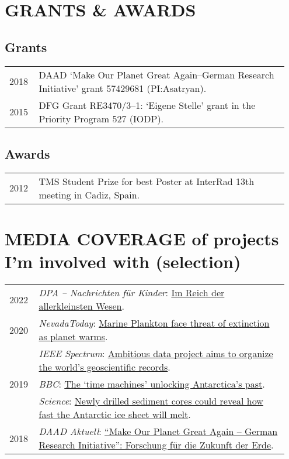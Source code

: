 \documentclass[11pt, a4paper]{article}
\begin{document}
\section{GRANTS \& AWARDS}
\subsection{Grants}
\begin{longtable}{@{}p{0.1\linewidth} P{0.85\linewidth}@{}}
2018 & DAAD `Make Our Planet Great Again--German Research Initiative' grant 57429681 (PI:Asatryan).\\
2015 & DFG Grant RE3470/3--1: `Eigene Stelle' grant in the Priority Program 527 (IODP).\\
\end{longtable}
\subsection{Awards}
\begin{longtable}{@{}p{0.1\linewidth} P{0.85\linewidth}@{}}
2012 & TMS Student Prize for best Poster at InterRad 13th meeting in Cadiz, Spain.\\
\end{longtable}

\section[MEDIA COVERAGE]{MEDIA COVERAGE \textnormal{\footnotesize{ of projects I'm involved with (selection)}}}
\begin{longtable}{@{}p{0.1\linewidth} P{0.85\linewidth}@{}}
2022 & \emph{DPA -- Nachrichten für Kinder}: \href{https://www.aachener-zeitung.de/karlo-clever/im-reich-der-allerkleinsten-wesen_aid-73918737}{Im Reich der allerkleinsten Wesen}.\\
2020 & \emph{NevadaToday}: \href{https://www.unr.edu/nevada-today/news/2020/marine-plankton}{Marine Plankton face threat of extinction as planet warms}.\\
 & \emph{IEEE Spectrum}: \href{https://spectrum.ieee.org/computing/software/ambitious-data-project-aims-to-organize-the-worlds-geoscientific-records}{Ambitious data project aims to organize the world’s geoscientific records}.\\
2019 & \emph{BBC}: \href{https://www.bbc.com/reel/video/p07bvx51/the-time-machines-unlocking-antarctica-s-past}{The `time machines' unlocking Antarctica's past}.\\
  & \emph{Science}: \href{http://dx.doi.org/10.1126/science.aax7040}{Newly drilled sediment cores could reveal how fast the Antarctic ice sheet will melt}.\\
2018 & \emph{DAAD Aktuell}: \href{https://www.daad.de/der-daad/daad-aktuell/de/66800-make-our-planet-great-again-german-research-initiative-forschung-fuer-die-zukunft-der-erde/}{``Make Our Planet Great Again -- German Research Initiative'': Forschung für die Zukunft der Erde}.\\
\end{longtable}
\end{document}
